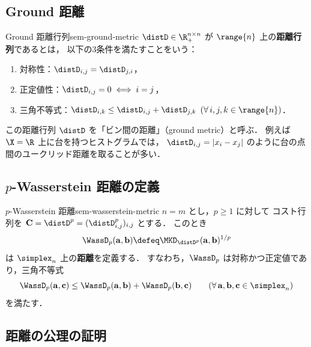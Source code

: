 \subsection{Ground 距離}

\begin{definition}{Ground 距離行列}{sem-ground-metric}
  $\distD \in \R_+^{n \times n}$ が $\range{n}$ 上の\textbf{距離行列}であるとは，
  以下の3条件を満たすことをいう：
  \begin{enumerate}
    \item[(i)] 対称性：$\distD_{i,j} = \distD_{j,i}$，
    \item[(ii)] 正定値性：$\distD_{i,j} = 0 \iff i = j$，
    \item[(iii)] 三角不等式：$\distD_{i,k} \leq \distD_{i,j} + \distD_{j,k}$
      \quad $(\forall\, i, j, k \in \range{n})$．
  \end{enumerate}
\end{definition}

この距離行列 $\distD$ を「ビン間の距離」（ground metric）と呼ぶ．
例えば $\X = \R$ 上に台を持つヒストグラムでは，
$\distD_{i,j} = |x_i - x_j|$ のように台の点間のユークリッド距離を取ることが多い．

\subsection{$p$-Wasserstein 距離の定義}

\begin{proposition}{$p$-Wasserstein 距離}{sem-wasserstein-metric}
  $n = m$ とし，$p \geq 1$ に対して
  コスト行列を $\mathbf{C} = \distD^p = (\distD_{i,j}^p)_{i,j}$ とする．
  このとき
  \[
    \WassD_p(\mathbf{a}, \mathbf{b})
    \defeq \MKD_{\distD^p}(\mathbf{a}, \mathbf{b})^{1/p}
  \]
  は $\simplex_n$ 上の\textbf{距離}を定義する．
  すなわち，$\WassD_p$ は対称かつ正定値であり，三角不等式
  \[
    \WassD_p(\mathbf{a}, \mathbf{c})
    \leq \WassD_p(\mathbf{a}, \mathbf{b})
    + \WassD_p(\mathbf{b}, \mathbf{c})
    \qquad (\forall\, \mathbf{a}, \mathbf{b}, \mathbf{c} \in \simplex_n)
  \]
  を満たす．
\end{proposition}

\subsection{距離の公理の証明}

